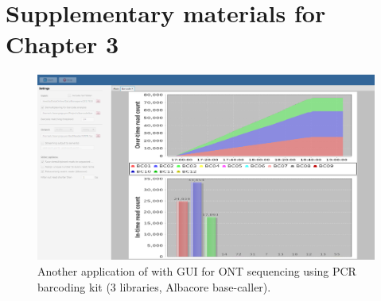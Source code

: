 \chapter{Supplementary materials for Chapter 3}\label{app:npbarcode}
\newpage

\begin{figure}[!hp]
\includegraphics[width=\textwidth]{images/vntr1.png}  
\caption[PCR barcode MinION sequencing with \npbarcode{}]
{Another application of \npbarcode{} with GUI for ONT sequencing using PCR barcoding kit (3 libraries, Albacore base-caller).}
\label{supp_fig:npbarcode_pcr}
\end{figure}

